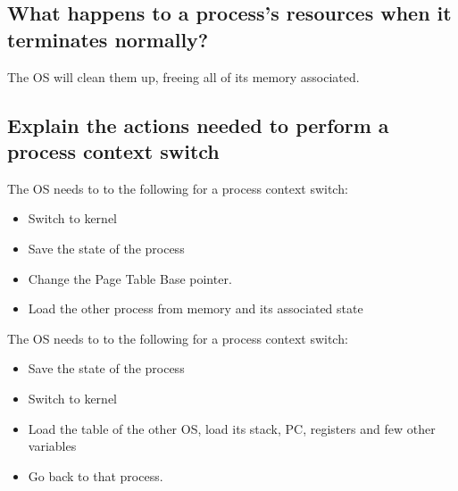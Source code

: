 \documentclass[a4paper]{article}
\begin{document}
\subsection{What happens to a process's resources when it terminates normally?} %
\label{sub:What happens to a process's resources when it terminates normally?}
The OS will clean them up, freeing all of its memory associated.
\subsection{Explain the actions needed to perform a process context switch} %
\label{sub:Explain the actions needed to perform a process context switch}
The OS needs to to the following for a process context switch:
\begin{itemize}
  \item Switch to kernel
  \item Save the state of the process
  \item Change the Page Table Base pointer.
  \item Load the other process from memory and its associated state
\end{itemize}

The OS needs to to the following for a process context switch:
\begin{itemize}
  \item Save the state of the process
  \item Switch to kernel
  \item Load the table of the other OS, load its stack, PC, registers and few other variables
  \item Go back to that process.
\end{itemize}
\end{document}
